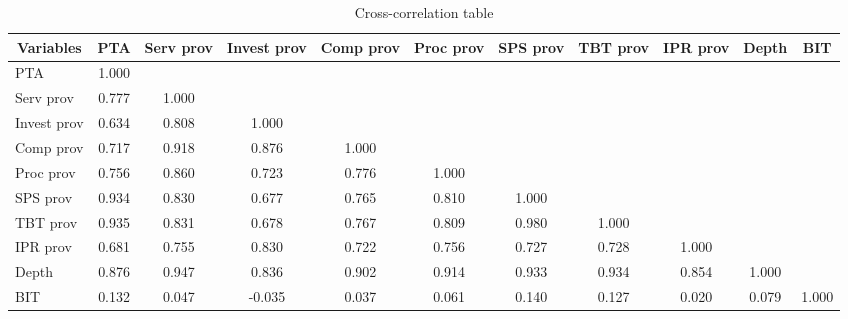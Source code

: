 \begin{table}[htbp]\centering \caption{Cross-correlation table\label{corrtable}}
\begin{tabular}{l  c  c  c  c  c  c  c  c  c  c }\hline\hline
\multicolumn{1}{c}{Variables} &PTA&Serv prov&Invest prov&Comp prov&Proc prov&SPS prov&TBT prov&IPR prov&Depth&BIT\\ \hline
PTA&1.000\\
Serv prov&0.777&1.000\\
Invest prov&0.634&0.808&1.000\\
Comp prov&0.717&0.918&0.876&1.000\\
Proc prov&0.756&0.860&0.723&0.776&1.000\\
SPS prov&0.934&0.830&0.677&0.765&0.810&1.000\\
TBT prov&0.935&0.831&0.678&0.767&0.809&0.980&1.000\\
IPR prov&0.681&0.755&0.830&0.722&0.756&0.727&0.728&1.000\\
Depth&0.876&0.947&0.836&0.902&0.914&0.933&0.934&0.854&1.000\\
BIT&0.132&0.047&-0.035&0.037&0.061&0.140&0.127&0.020&0.079&1.000\\
\hline \hline 
 \end{tabular}
\end{table}
